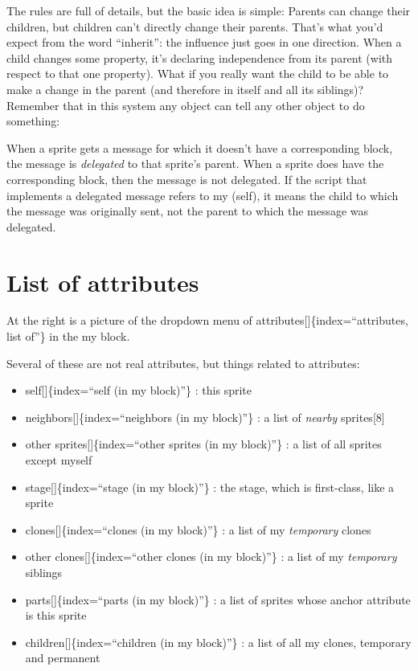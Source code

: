 \documentclass[
  letterpaper,
]{book}
\begin{document}
The rules are full of details, but the basic idea is simple: Parents can
change their children, but children can't directly change their parents.
That's what you'd expect from the word ``inherit'': the influence just
goes in one direction. When a child changes some property, it's
declaring independence from its parent (with respect to that one
property). What if you really want the child to be able to make a change
in the parent (and therefore in itself and all its siblings)? Remember
that in this system any object can tell any other object to do
something:

When a sprite gets a message for which it doesn't have a corresponding
block, the message is \emph{delegated} to that sprite's parent. When a
sprite does have the corresponding block, then the message is not
delegated. If the script that implements a delegated message refers to
my (self), it means the child to which the message was originally sent,
not the parent to which the message was delegated.

\section{List of attributes}\label{list-of-attributes}

At the right is a picture of the dropdown menu of
attributes{[}{]}\{index=``attributes, list of''\} in the my block.

Several of these are not real attributes, but things related to
attributes:

\begin{itemize}
\item
  self{[}{]}\{index=``self (in my block)''\} : this sprite
\item
  neighbors{[}{]}\{index=``neighbors (in my block)''\} : a list of
  \emph{nearby} sprites{[}8{]}
\item
  other sprites{[}{]}\{index=``other sprites (in my block)''\} : a list
  of all sprites except myself
\item
  stage{[}{]}\{index=``stage (in my block)''\} : the stage, which is
  first-class, like a sprite
\item
  clones{[}{]}\{index=``clones (in my block)''\} : a list of my
  \emph{temporary} clones
\item
  other clones{[}{]}\{index=``other clones (in my block)''\} : a list of
  my \emph{temporary} siblings
\item
  parts{[}{]}\{index=``parts (in my block)''\} : a list of sprites whose
  anchor attribute is this sprite
\item
  children{[}{]}\{index=``children (in my block)''\} : a list of all my
  clones, temporary and permanent
\end{itemize}
\end{document}
